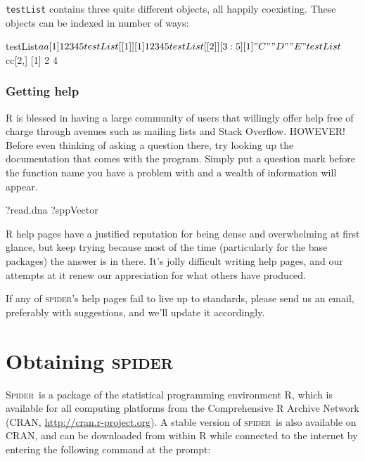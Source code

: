 \documentclass{article}
\newcommand{\spider}{\textsc{spider}} %
\newcommand{\Spider}{\textsc{Spider}} %
\newcommand{\progname}[1]{\textsc{#1}}
\newcommand{\fun}[1]{\texttt{#1}}
\begin{document}
\fun{testList} contains three quite different objects, all happily coexisting. These objects can be indexed in number of ways:

\begin{Rio}
testList$aa
[1] 1 2 3 4 5
testList[[1]]
[1] 1 2 3 4 5
testList[[2]][3:5]
[1] "C" "D" "E"
testList$cc[2,]
[1] 2 4
\end{Rio}




\subsubsection{Getting help}
\progname{R} is blessed in having a large community of users that willingly offer help free of charge through avenues such as mailing lists and Stack Overflow. HOWEVER! Before even thinking of asking a question there, try looking up the documentation that comes with the program. Simply put a question mark before the function name you have a problem with and a wealth of information will appear. 

\begin{console}
?read.dna
?sppVector
\end{console}

\progname{R} help pages have a justified reputation for being dense and overwhelming at first glance, but keep trying because most of the time (particularly for the base packages) the answer is in there. It's jolly difficult writing help pages, and our attempts at it renew our appreciation for what others have produced.

If any of \spider's help pages fail to live up to standards, please send us an email, preferably with suggestions, and we'll update it accordingly.



\section{Obtaining \spider}
\Spider~is a package of the statistical programming environment \progname{R}, which is available for all computing platforms from the Comprehensive R Archive Network (CRAN, \href{http://cran.r-project.org}{http://cran.r-project.org}). A stable version of \spider~is also available on CRAN, and can be downloaded from within R while connected to the internet by entering the following command at the prompt:
\end{document}
